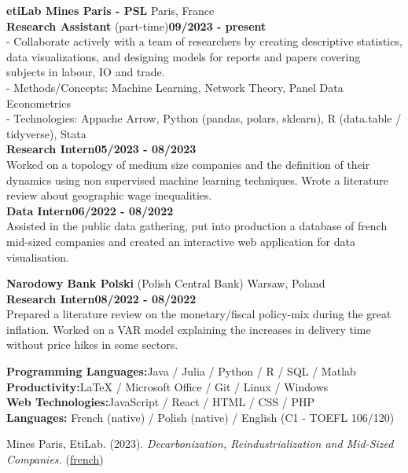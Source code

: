     \noindent\textbf{etiLab Mines Paris - PSL} \hfill Paris, France\\[0.1cm]
    \textbf{Research Assistant} (part-time)\hfill \textbf{09/2023 - present} \\
        - Collaborate actively with a team of researchers by creating descriptive statistics, data visualizations, and designing models for reports and papers covering subjects in labour, IO and trade.\\
        - Methods/Concepts: Machine Learning, Network Theory, Panel Data Econometrics \\
        - Technologies: Appache Arrow, Python (pandas, polars, sklearn), R (data.table / tidyverse), Stata  \\[0.1cm]
    \textbf{Research Intern}\hfill \textbf{05/2023 - 08/2023} \\
    Worked on a topology of medium size companies and the definition of their dynamics using non supervised machine learning techniques. Wrote a literature review about geographic wage inequalities.  \\[0.1cm]
    \textbf{Data Intern}\hfill \textbf{06/2022 - 08/2022} \\
    Assisted in the public data gathering, put into production a database of french mid-sized companies and created an interactive web application for data visualisation.

    \vspace{0.2cm}

    \noindent\textbf{Narodowy Bank Polski} (Polish Central Bank) \hfill Warsaw, Poland\\[0.1cm]
    \textbf{Research Intern}\hfill \textbf{08/2022  - 08/2022} \\
    Prepared a literature review on the monetary/fiscal policy-mix during the great inflation. Worked on a VAR model explaining the increases in delivery time without price hikes in some sectors. 

\begin{flushleft}\vspace{-0.1cm}
\raisebox{-.6ex}{SKILLS} \hrulefill
\end{flushleft}\vspace{-0.1cm}

    \noindent\textbf{Programming Languages:}\hfill{Java / Julia / Python / R / SQL / Matlab} \\
    \textbf{Productivity:}\hfill LaTeX / Microsoft Office / Git / Linux / Windows\\
    \textbf{Web Technologies:}\hfill JavaScript / React / HTML / CSS / PHP  \\
    \textbf{Languages:} \hfill French (native) / Polish (native) / English (C1 - TOEFL 106/120) 

\begin{flushleft}
\raisebox{-.6ex}{CONTRIBUTIONS \& PROJECTS} \hrulefill
\end{flushleft}

    \noindent Mines Paris, EtiLab. (2023). \emph{Decarbonization, Reindustrialization and Mid-Sized Companies.} (\href{https://etilab.minesparis.psl.eu/wp-content/uploads/2023/12/etilab-decarboner-les-ETI-04dec23.pdf}{\underline{french}})  